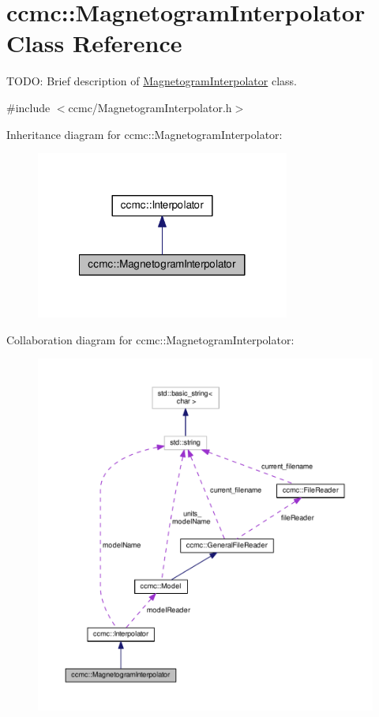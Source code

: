 \hypertarget{classccmc_1_1_magnetogram_interpolator}{\section{ccmc\-:\-:Magnetogram\-Interpolator Class Reference}
\label{classccmc_1_1_magnetogram_interpolator}
}


T\-O\-D\-O\-: Brief description of \hyperlink{classccmc_1_1_magnetogram_interpolator}{Magnetogram\-Interpolator} class.  




{\ttfamily \#include $<$ccmc/\-Magnetogram\-Interpolator.\-h$>$}



Inheritance diagram for ccmc\-:\-:Magnetogram\-Interpolator\-:
\nopagebreak
\begin{figure}[H]
\begin{center}
\leavevmode
\includegraphics[width=236pt]{classccmc_1_1_magnetogram_interpolator__inherit__graph}
\end{center}
\end{figure}


Collaboration diagram for ccmc\-:\-:Magnetogram\-Interpolator\-:
\nopagebreak
\begin{figure}[H]
\begin{center}
\leavevmode
\includegraphics[width=350pt]{classccmc_1_1_magnetogram_interpolator__coll__graph}
\end{center}
\end{figure}
